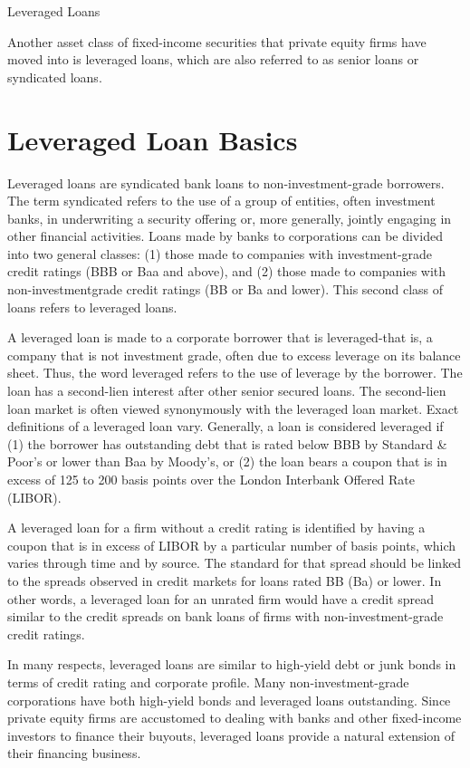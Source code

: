 \documentclass[11pt]{article}
\begin{document}
Leveraged Loans

Another asset class of fixed-income securities that private equity firms have moved into is leveraged loans, which are also referred to as senior loans or syndicated loans.

\section*{Leveraged Loan Basics}
Leveraged loans are syndicated bank loans to non-investment-grade borrowers. The term syndicated refers to the use of a group of entities, often investment banks, in underwriting a security offering or, more generally, jointly engaging in other financial activities. Loans made by banks to corporations can be divided into two general classes: (1) those made to companies with investment-grade credit ratings (BBB or Baa and above), and (2) those made to companies with non-investmentgrade credit ratings (BB or Ba and lower). This second class of loans refers to leveraged loans.

A leveraged loan is made to a corporate borrower that is leveraged-that is, a company that is not investment grade, often due to excess leverage on its balance sheet. Thus, the word leveraged refers to the use of leverage by the borrower. The loan has a second-lien interest after other senior secured loans. The second-lien loan market is often viewed synonymously with the leveraged loan market. Exact definitions of a leveraged loan vary. Generally, a loan is considered leveraged if (1) the borrower has outstanding debt that is rated below BBB by Standard \& Poor's or lower than Baa by Moody's, or (2) the loan bears a coupon that is in excess of 125 to 200 basis points over the London Interbank Offered Rate (LIBOR).

A leveraged loan for a firm without a credit rating is identified by having a coupon that is in excess of LIBOR by a particular number of basis points, which varies through time and by source. The standard for that spread should be linked to the spreads observed in credit markets for loans rated BB (Ba) or lower. In other words, a leveraged loan for an unrated firm would have a credit spread similar to the credit spreads on bank loans of firms with non-investment-grade credit ratings.

In many respects, leveraged loans are similar to high-yield debt or junk bonds in terms of credit rating and corporate profile. Many non-investment-grade corporations have both high-yield bonds and leveraged loans outstanding. Since private equity firms are accustomed to dealing with banks and other fixed-income investors to finance their buyouts, leveraged loans provide a natural extension of their financing business.
\end{document}
